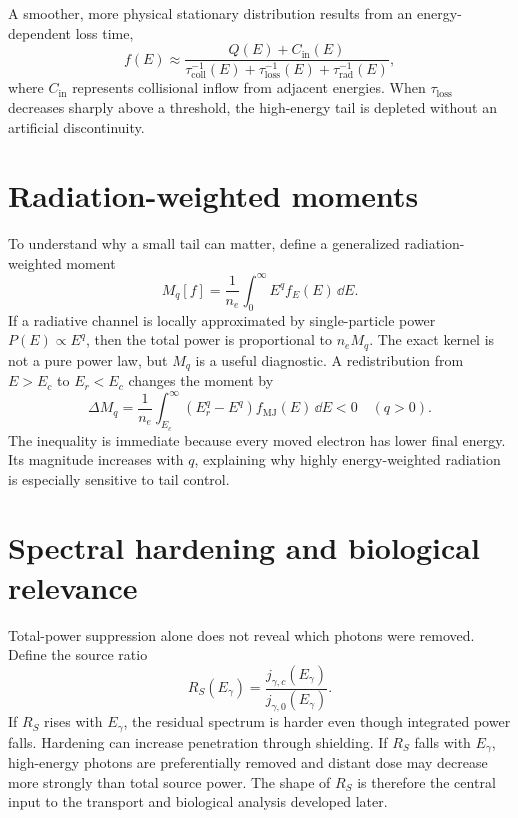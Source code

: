 A smoother, more physical stationary distribution results from an energy-dependent loss time,
\begin{equation}
 f(E)\approx \frac{Q(E)+C_{\mathrm{in}}(E)}{\tau_{\mathrm{coll}}^{-1}(E)+\tau_{\mathrm{loss}}^{-1}(E)+\tau_{\mathrm{rad}}^{-1}(E)},
\label{eq:stationary-schematic}
\end{equation}
where $C_{\mathrm{in}}$ represents collisional inflow from adjacent energies. When $\tau_{\mathrm{loss}}$ decreases sharply above a threshold, the high-energy tail is depleted without an artificial discontinuity.

\section{Radiation-weighted moments}

To understand why a small tail can matter, define a generalized radiation-weighted moment
\begin{equation}
M_q[f]=\frac{1}{n_e}\int_0^\infty E^q f_E(E)\,\dd E.
\label{eq:moment}
\end{equation}
If a radiative channel is locally approximated by single-particle power $P(E)\propto E^q$, then the total power is proportional to $n_eM_q$. The exact kernel is not a pure power law, but $M_q$ is a useful diagnostic. A redistribution from $E>E_c$ to $E_r<E_c$ changes the moment by
\begin{equation}
\Delta M_q
=\frac{1}{n_e}\int_{E_c}^{\infty}\left(E_r^q-E^q\right)f_{\mathrm{MJ}}(E)\,\dd E<0
\quad(q>0).
\label{eq:moment-change}
\end{equation}
The inequality is immediate because every moved electron has lower final energy. Its magnitude increases with $q$, explaining why highly energy-weighted radiation is especially sensitive to tail control.

\section{Spectral hardening and biological relevance}

Total-power suppression alone does not reveal which photons were removed. Define the source ratio
\begin{equation}
 R_S(E_\gamma)=\frac{j_{\gamma,c}(E_\gamma)}{j_{\gamma,0}(E_\gamma)}.
\label{eq:spectral-ratio}
\end{equation}
If $R_S$ rises with $E_\gamma$, the residual spectrum is harder even though integrated power falls. Hardening can increase penetration through shielding. If $R_S$ falls with $E_\gamma$, high-energy photons are preferentially removed and distant dose may decrease more strongly than total source power. The shape of $R_S$ is therefore the central input to the transport and biological analysis developed later.

